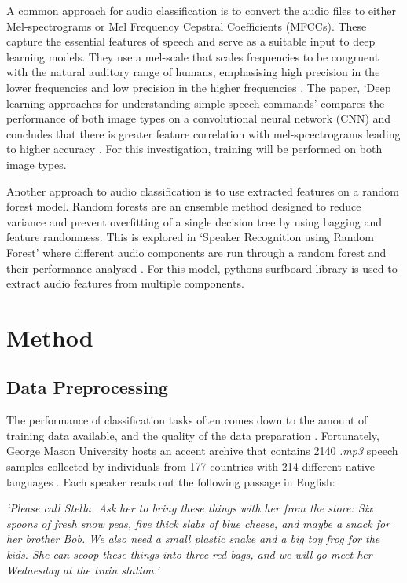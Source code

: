 \documentclass[conference]{IEEEtran}
\begin{document}
A common approach for audio classification is to convert the audio files to either Mel-spectrograms or Mel Frequency Cepstral Coefficients (MFCCs). These capture the essential features of speech and serve as a suitable input to deep learning models. They use a mel-scale that scales frequencies to be congruent with the natural auditory range of humans, emphasising high precision in the lower frequencies and low precision in the higher frequencies \cite{SimpleSpeech, MusicGenre}. The paper, ‘Deep learning approaches for understanding simple speech commands’ compares the performance of both image types on a convolutional neural network (CNN) and concludes that there is greater feature correlation with mel-spcectrograms leading to higher accuracy \cite{SimpleSpeech}. For this investigation, training will be performed on both image types.

Another approach to audio classification is to use extracted features on a random forest model. Random forests are an ensemble method designed to reduce variance and prevent overfitting of a single decision tree by using bagging and feature randomness. This is explored in ‘Speaker Recognition using Random Forest’ where different audio components are run through a random forest and their performance analysed \cite{nawas2021speaker}. For this model, pythons surfboard library is used to extract audio features from multiple components. 

\section{Method}
\subsection{Data Preprocessing}

The performance of classification tasks often comes down to the amount of training data available, and the quality of the data preparation \cite{dcgan}. Fortunately, George Mason University hosts an accent archive that contains 2140 \textit{.mp3} speech samples collected by individuals from 177 countries with 214 different native languages \cite{dataset}. Each speaker reads out the following passage in English:

\bigbreak{}

\textit{‘Please call Stella. Ask her to bring these things with her from the store: Six spoons of fresh snow peas, five thick slabs of blue cheese, and maybe a snack for her brother Bob. We also need a small plastic snake and a big toy frog for the kids. She can scoop these things into three red bags, and we will go meet her Wednesday at the train station.’}
\end{document}
